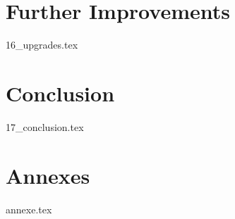 \documentclass[a4paper, 12pt, titlepage, oneside]{report}
\begin{document}
\chapter{Further Improvements}
{16_upgrades.tex}
\newpage

\chapter{Conclusion}
{17_conclusion.tex}
\newpage

\chapter*{Annexes}
{annexe.tex}
\newpage

\printglossary[title=Acronymes,type=\acronymtype]
\newpage 
\printglossary
\newpage 

\printbibliography[heading=bibintoc]
\end{document}
